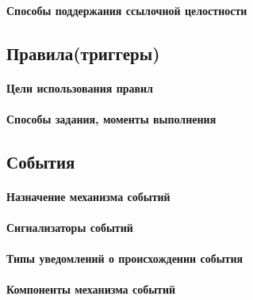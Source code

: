 \paragraph{Способы поддержания ссылочной целостности}

\subsection{Правила(триггеры)}
\paragraph{Цели использования правил}
\paragraph{Способы задания, моменты выполнения}

\subsection{События}

\paragraph{Назначение механизма событий}
\paragraph{Сигнализаторы событий}
\paragraph{Типы уведомлений о происхождении события}
\paragraph{Компоненты механизма событий}